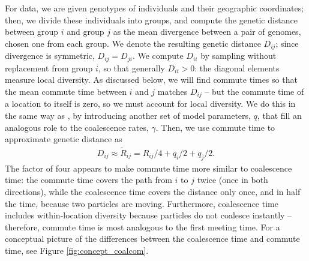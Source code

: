 \documentclass{article}
\newcommand{\comdist}{\widetilde{R}}
\begin{document}
For data, we are given genotypes of individuals and their geographic coordinates;
then, we divide these individuals into groups,
and compute the genetic distance between group $i$ and group $j$
as the mean divergence between a pair of genomes, chosen one from each group.
We denote the resulting genetic distance $D_{ij}$;
since divergence is symmetric, $D_{ij} = D_{ji}$.
We compute $D_{ii}$ by sampling without replacement from group $i$,
so that generally $D_{ii} > 0$: the diagonal elements measure local diversity.
As discussed below, we will find commute times so that the mean commute time between
$i$ and $j$ matches $D_{ij}$ -- but the commute time of a location to itself is zero,
so we must account for local diversity.
We do this in the same way as \citet{petkova2016visualizing},
by introducing another set of model parameters, $q$, 
that fill an analogous role to the coalescence rates, $\gamma$.
Then, we use commute time to approximate genetic distance as
\begin{align} \label{eq:commute_approx}
	D_{ij} \approx \comdist_{ij} = R_{ij}/4 + q_{i}/2 + q_{j}/2 .
\end{align}
The factor of four appears to make commute time more similar to coalescence time:
the commute time covers the path from $i$ to $j$ twice
(once in both directions),
while the coalescence time covers the distance only once,
and in half the time, because two particles are moving.
Furthermore, coalescence time includes within-location diversity
because particles do not coalesce instantly --
therefore, commute time is most analogous to the first meeting time.
For a conceptual picture of the differences between the coalescence time and commute time,
see Figure \ref{fig:concept_coalcom}. 
\end{document}
